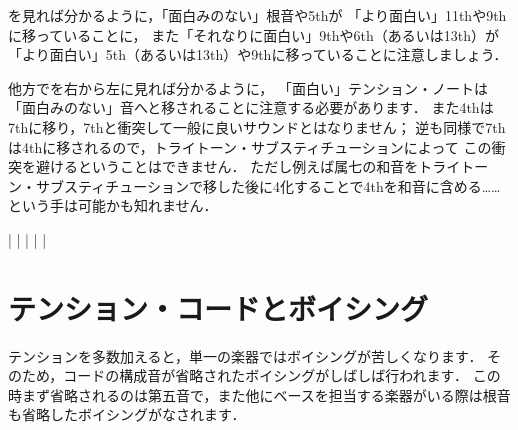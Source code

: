 \documentclass[dvipdfmx,uplatex,b5paper,openany,jbase=12Q,nomag*,textwidth-limit=44%
               ]{gachimuchi}[2020/05/05]
\begin{document}
を見れば分かるように，「面白みのない」根音や5thが
「より面白い」\bSharp11thや\bFlat9thに移っていることに，
また「それなりに面白い」\bNatural9thや\bNatural6th（あるいは\bNatural13th）が
「より面白い」\bSharp5th（あるいは\bFlat13th）や\bSharp9thに移っていることに注意しましょう．

他方でを右から左に見れば分かるように，
「面白い」テンション・ノートは「面白みのない」音へと移されることに注意する必要があります．
また4thは\bNatural7thに移り，\bFlat7thと衝突して一般に良いサウンドとはなりません；
逆も同様で\bNatural7thは4thに移されるので，トライトーン・サブスティチューションによって
この衝突を避けるということはできません．
ただし例えば属七の和音をトライトーン・サブスティチューションで移した後に\Sus4化することで4thを和音に含める……
という手は可能かも知れません．
\begin{Music}
  \Startpiece
  \Notes%
  |%
  \en\bar
  \Notes%
  |%
  \en\bar
  \Notes%
  |%
  \en
  \endpiece
\end{Music}



\section{テンション・コードとボイシング}
テンションを多数加えると，単一の楽器ではボイシングが苦しくなります．
そのため，コードの構成音が省略されたボイシングがしばしば行われます．
この時まず省略されるのは第五音で，また他にベースを担当する楽器がいる際は根音も省略したボイシングがなされます．
\end{document}

